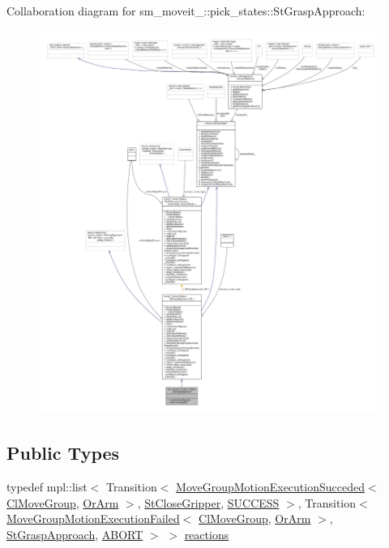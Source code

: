 Collaboration diagram for sm\+\_\+moveit\+\_\+:\+:pick\+\_\+states\+:\+:St\+Grasp\+Approach\+:
\nopagebreak
\begin{figure}[H]
\begin{center}
\leavevmode
\includegraphics[width=350pt]{structsm__moveit__3_1_1pick__states_1_1StGraspApproach__coll__graph}
\end{center}
\end{figure}
\subsection*{Public Types}
\begin{DoxyCompactItemize}
\item 
typedef mpl\+::list$<$ Transition$<$ \hyperlink{structmoveit__z__client_1_1MoveGroupMotionExecutionSucceded}{Move\+Group\+Motion\+Execution\+Succeded}$<$ \hyperlink{classmoveit__z__client_1_1ClMoveGroup}{Cl\+Move\+Group}, \hyperlink{classsm__moveit__3_1_1OrArm}{Or\+Arm} $>$, \hyperlink{structsm__moveit__3_1_1pick__states_1_1StCloseGripper}{St\+Close\+Gripper}, \hyperlink{classSUCCESS}{S\+U\+C\+C\+E\+SS} $>$, Transition$<$ \hyperlink{structmoveit__z__client_1_1MoveGroupMotionExecutionFailed}{Move\+Group\+Motion\+Execution\+Failed}$<$ \hyperlink{classmoveit__z__client_1_1ClMoveGroup}{Cl\+Move\+Group}, \hyperlink{classsm__moveit__3_1_1OrArm}{Or\+Arm} $>$, \hyperlink{structsm__moveit__3_1_1pick__states_1_1StGraspApproach}{St\+Grasp\+Approach}, \hyperlink{classABORT}{A\+B\+O\+RT} $>$ $>$ \hyperlink{structsm__moveit__3_1_1pick__states_1_1StGraspApproach_a26e2854caafae5beb654ea0013301526}{reactions}
\end{DoxyCompactItemize}
